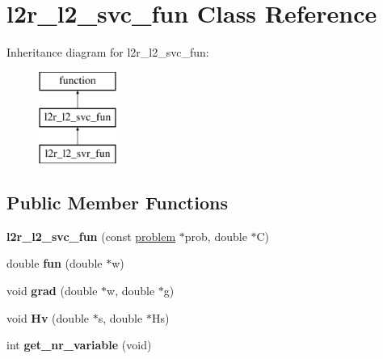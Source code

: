 \hypertarget{classl2r__l2__svc__fun}{\section{l2r\-\_\-l2\-\_\-svc\-\_\-fun Class Reference}
\label{classl2r__l2__svc__fun}
}
Inheritance diagram for l2r\-\_\-l2\-\_\-svc\-\_\-fun\-:\begin{figure}[H]
\begin{center}
\leavevmode
\includegraphics[height=3.000000cm]{classl2r__l2__svc__fun}
\end{center}
\end{figure}
\subsection*{Public Member Functions}
\begin{DoxyCompactItemize}
\item 
\hypertarget{classl2r__l2__svc__fun_abe8687d0ecfbd9611b0dbd88f432a471}{{\bfseries l2r\-\_\-l2\-\_\-svc\-\_\-fun} (const \hyperlink{structproblem}{problem} $\ast$prob, double $\ast$C)}\label{classl2r__l2__svc__fun_abe8687d0ecfbd9611b0dbd88f432a471}

\item 
\hypertarget{classl2r__l2__svc__fun_a02b4ce2d1f495ee6c00fab04a9f51a9f}{double {\bfseries fun} (double $\ast$w)}\label{classl2r__l2__svc__fun_a02b4ce2d1f495ee6c00fab04a9f51a9f}

\item 
\hypertarget{classl2r__l2__svc__fun_a0dddef75eb792d74ccaa643c1d02b2e5}{void {\bfseries grad} (double $\ast$w, double $\ast$g)}\label{classl2r__l2__svc__fun_a0dddef75eb792d74ccaa643c1d02b2e5}

\item 
\hypertarget{classl2r__l2__svc__fun_a1c17625b644230f2d4cd055533ce14db}{void {\bfseries Hv} (double $\ast$s, double $\ast$Hs)}\label{classl2r__l2__svc__fun_a1c17625b644230f2d4cd055533ce14db}

\item 
\hypertarget{classl2r__l2__svc__fun_a2c497ce4d773cb744f9bdb3cd946db59}{int {\bfseries get\-\_\-nr\-\_\-variable} (void)}\label{classl2r__l2__svc__fun_a2c497ce4d773cb744f9bdb3cd946db59}

\end{DoxyCompactItemize}

